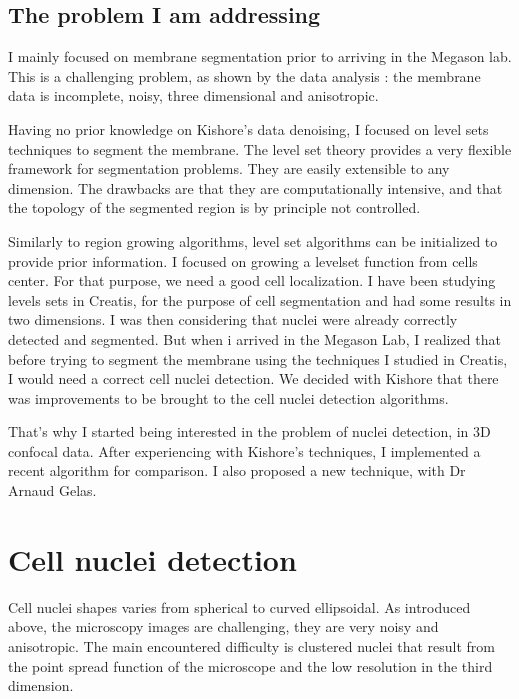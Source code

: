 \subsection{The problem I am addressing}

I mainly focused on membrane segmentation prior to arriving in the Megason lab. This is a challenging problem, as shown by the data analysis : the membrane data is incomplete, noisy, three dimensional and anisotropic.

Having no prior knowledge on Kishore's data denoising, I focused on level sets techniques to segment the membrane.
The level set theory provides a very flexible framework for segmentation problems. They are easily extensible to any dimension.
The drawbacks are that they are computationally intensive, and that the topology of the segmented region is by principle not controlled.

Similarly to region growing algorithms, level set algorithms can be initialized to provide prior information.
I focused on growing a levelset function from cells center. For that purpose, we need a good cell localization.
I have been studying levels sets in Creatis, for the purpose of cell segmentation and had some results in two dimensions.
I was then considering that nuclei were already correctly detected and segmented.
But when i arrived in the Megason Lab, I realized that before trying to segment the membrane using the techniques I studied in Creatis, I would need a correct cell nuclei detection.
We decided with Kishore that there was improvements to be brought to the cell nuclei detection algorithms.

That's why I started being interested in the problem of nuclei detection, in 3D confocal data.
After experiencing with Kishore's techniques, I implemented a recent algorithm for comparison. I also proposed a new technique, with Dr Arnaud Gelas.



%
%


\section{Cell nuclei detection}

Cell nuclei shapes varies from spherical to curved ellipsoidal. As introduced above, the microscopy images are challenging, they are very noisy and anisotropic.
The main encountered difficulty is clustered nuclei that result from the point spread function of the microscope and the low resolution in the third dimension.

